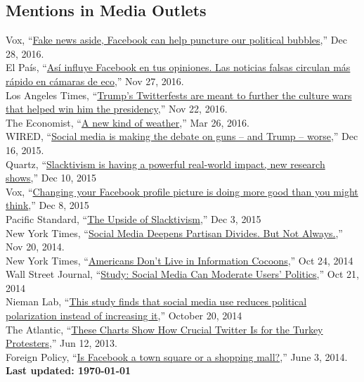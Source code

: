 \documentclass[margin,line,11pt]{resume}
\newcommand{\nl}{\vspace{0.10in}\\}
\begin{document}
\begin{resume}
                \section{\mysidestyle Mentions in Media Outlets}
Vox, ``\href{http://www.vox.com/the-big-idea/2016/12/28/14095452/fake-news-political-bubbles-democracy-facebook}{Fake news aside, Facebook can help puncture our political bubbles},'' Dec 28, 2016.\nl
El Pa\'{i}s, ``\href{http://internacional.elpais.com/internacional/2016/11/25/actualidad/1480095728_565471.html}{As\'{i} influye Facebook en tus opiniones. Las noticias falsas circulan m\'{a}s r\'{a}pido en c\'{a}maras de eco},'' Nov 27, 2016.\nl
Los Angeles Times, ``\href{http://www.latimes.com/politics/la-na-pol-trump-twitter-20161122-story.html}{Trump's Twitterfests are meant to further the culture wars that helped win him the presidency},'' Nov 22, 2016.\nl 
The Economist, ``\href{http://www.economist.com/news/special-report/21695192-social-media-now-play-key-role-collective-action-new-kind-weather}{A new kind of weather},'' Mar 26, 2016.\nl
WIRED, ``\href{http://www.wired.com/2015/12/social-media-is-making-the-debate-on-guns-and-trump-worse/}{Social media is making the debate on guns -- and Trump -- worse},'' Dec 16, 2015.\nl
Quartz, ``\href{http://qz.com/570009/slacktivism-is-having-a-powerful-real-world-impact-new-research-shows/}{Slacktivism is having a powerful real-world impact, new research shows},'' Dec 10, 2015\nl
Vox, ``\href{http://www.vox.com/2015/12/8/9873822/social-media-activism-science}{Changing your Facebook profile picture is doing more good than you might think},'' Dec 8, 2015\nl
Pacific Standard, ``\href{https://psmag.com/the-upside-of-slacktivism-2a93294941b0#.hp2xyepdf}{The Upside of Slacktivism},'' Dec 3, 2015\nl
New York Times, ``\href{http://www.nytimes.com/2014/11/21/upshot/social-media-deepens-partisan-divides-but-not-always.html?_r=0}{Social Media Deepens Partisan Divides. But Not Always.},'' Nov 20, 2014.\nl
New York Times, ``\href{http://www.nytimes.com/2014/10/25/upshot/americans-dont-live-in-information-cocoons.html?_r=0}{Americans Don't Live in Information Cocoons},'' Oct 24, 2014\nl
Wall Street Journal, ``\href{http://blogs.wsj.com/washwire/2014/10/21/study-social-media-can-moderate-users-politics/}{Study: Social Media Can Moderate Users' Politics},'' Oct 21, 2014\nl
Nieman Lab, ``\href{http://www.niemanlab.org/2014/10/this-study-finds-that-social-media-use-reduces-political-polarization-instead-of-increasing-it/}{This study finds that social media use reduces political polarization instead of increasing it},'' October 20, 2014\nl
The Atlantic, ``\href{http://www.theatlantic.com/international/archive/2013/06/these-charts-show-how-crucial-twitter-is-for-the-turkey-protesters/276798/}{These Charts Show How Crucial Twitter Is for the Turkey Protesters},'' Jun 12, 2013.\nl
Foreign Policy, ``\href{http://foreignpolicy.com/2013/06/03/is-facebook-a-town-square-or-a-shopping-mall/}{Is Facebook a town square or a shopping mall?},'' June 3, 2014.\nl

\centering \textbf{Last updated: \today}
    


\end{resume}
\end{document}
